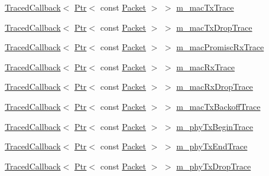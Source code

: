 \begin{DoxyCompactItemize}
\item 
\hyperlink{classns3_1_1TracedCallback}{Traced\+Callback}$<$ \hyperlink{classns3_1_1Ptr}{Ptr}$<$ const \hyperlink{classns3_1_1Packet}{Packet} $>$ $>$ \hyperlink{classns3_1_1CsmaNetDevice_acd8f03ea3f02befd6caa2b07065ac80a}{m\+\_\+mac\+Tx\+Trace}
\item 
\hyperlink{classns3_1_1TracedCallback}{Traced\+Callback}$<$ \hyperlink{classns3_1_1Ptr}{Ptr}$<$ const \hyperlink{classns3_1_1Packet}{Packet} $>$ $>$ \hyperlink{classns3_1_1CsmaNetDevice_ac6e2a81eedea1fa443600bbac37842b2}{m\+\_\+mac\+Tx\+Drop\+Trace}
\item 
\hyperlink{classns3_1_1TracedCallback}{Traced\+Callback}$<$ \hyperlink{classns3_1_1Ptr}{Ptr}$<$ const \hyperlink{classns3_1_1Packet}{Packet} $>$ $>$ \hyperlink{classns3_1_1CsmaNetDevice_a4b22f431d8511abaf9ef4e92cc41ce24}{m\+\_\+mac\+Promisc\+Rx\+Trace}
\item 
\hyperlink{classns3_1_1TracedCallback}{Traced\+Callback}$<$ \hyperlink{classns3_1_1Ptr}{Ptr}$<$ const \hyperlink{classns3_1_1Packet}{Packet} $>$ $>$ \hyperlink{classns3_1_1CsmaNetDevice_a40f2a9fcb15d1e44fc918d1639bff18a}{m\+\_\+mac\+Rx\+Trace}
\item 
\hyperlink{classns3_1_1TracedCallback}{Traced\+Callback}$<$ \hyperlink{classns3_1_1Ptr}{Ptr}$<$ const \hyperlink{classns3_1_1Packet}{Packet} $>$ $>$ \hyperlink{classns3_1_1CsmaNetDevice_a0ba6e9b6d9403e55044c695ece47e311}{m\+\_\+mac\+Rx\+Drop\+Trace}
\item 
\hyperlink{classns3_1_1TracedCallback}{Traced\+Callback}$<$ \hyperlink{classns3_1_1Ptr}{Ptr}$<$ const \hyperlink{classns3_1_1Packet}{Packet} $>$ $>$ \hyperlink{classns3_1_1CsmaNetDevice_a1f035d24ccf03e5731243e0b22665cb0}{m\+\_\+mac\+Tx\+Backoff\+Trace}
\item 
\hyperlink{classns3_1_1TracedCallback}{Traced\+Callback}$<$ \hyperlink{classns3_1_1Ptr}{Ptr}$<$ const \hyperlink{classns3_1_1Packet}{Packet} $>$ $>$ \hyperlink{classns3_1_1CsmaNetDevice_a6c5deac5e6a05a2013175402d4e22985}{m\+\_\+phy\+Tx\+Begin\+Trace}
\item 
\hyperlink{classns3_1_1TracedCallback}{Traced\+Callback}$<$ \hyperlink{classns3_1_1Ptr}{Ptr}$<$ const \hyperlink{classns3_1_1Packet}{Packet} $>$ $>$ \hyperlink{classns3_1_1CsmaNetDevice_a8cac1ff27eec4db589ed00545f942a21}{m\+\_\+phy\+Tx\+End\+Trace}
\item 
\hyperlink{classns3_1_1TracedCallback}{Traced\+Callback}$<$ \hyperlink{classns3_1_1Ptr}{Ptr}$<$ const \hyperlink{classns3_1_1Packet}{Packet} $>$ $>$ \hyperlink{classns3_1_1CsmaNetDevice_ad2a07cf80f83d9ce17d9280775e9a1f8}{m\+\_\+phy\+Tx\+Drop\+Trace}

\end{DoxyCompactItemize}
